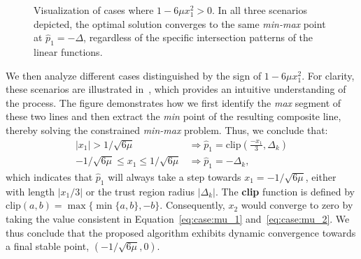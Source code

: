 \begin{figure}[H]
\begin{subfigure}[b]{0.30\textwidth}
\end{subfigure}%
\caption{Visualization of cases where $1-6\mu x_1^2 > 0$. In all three scenarios depicted, the optimal solution converges to the same \textit{min-max} point at $\hat{p}_1=-\Delta$, regardless of the specific intersection patterns of the linear functions.}
\label{fig:case-visualization02}
\end{figure}
We then analyze different cases distinguished by the sign of $1-6\mu x_1^2$. For clarity, these scenarios are illustrated in~, which provides an intuitive understanding of the process. The figure demonstrates how we first identify the \textit{max} segment of these two lines and then extract the \textit{min} point of the resulting composite line, thereby solving the constrained \textit{min-max} problem. Thus, we conclude that:
\begin{align}
|x_1| > 1/\sqrt{6\mu} &\Rightarrow \hat{p}_1  = \mathrm{clip}(\frac{-x_1}{3},\Delta_k) \\
-1/\sqrt{6\mu}\leq x_1 \leq 1/\sqrt{6\mu} &\Rightarrow \hat{p}_1  = -\Delta_k,
\end{align}
which indicates that $\hat{p}_1$ will always take a step towards $x_1=-1/\sqrt{6\mu}$, either with length $|x_1/3|$ or the trust region radius $|\Delta_k|$. The \textbf{clip} function is defined by $\mathrm{clip}(a,b) = \max\{\min\{a,b\},-b\}$. Consequently, $x_2$ would converge to zero by taking the value consistent in Equation~\eqref{eq:case:mu_1} and~\eqref{eq:case:mu_2}. We thus conclude that the proposed algorithm exhibits dynamic convergence towards a final stable point, $(-1/\sqrt{6\mu},0)$.

